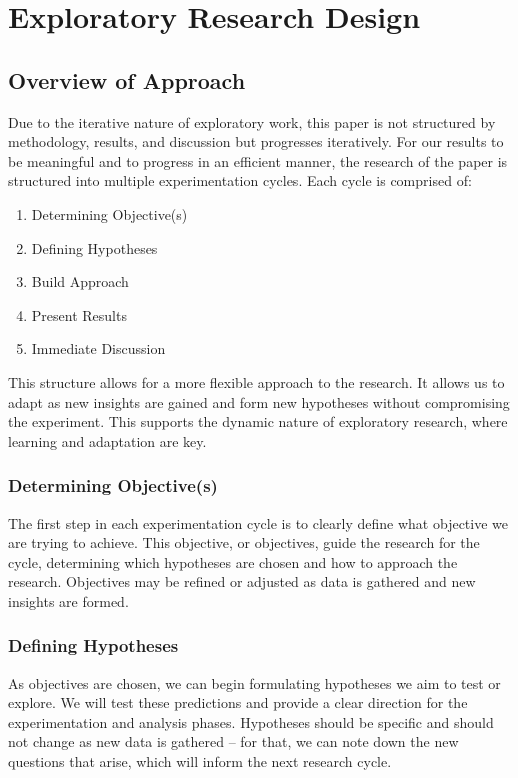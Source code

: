 \chapter{Exploratory Research Design}
\label{chap:exploratoryResearchDesign}

\section{Overview of Approach}
Due to the iterative nature of exploratory work, this paper is not structured by methodology, results, and discussion but progresses iteratively. For our results to be meaningful and to progress in an efficient manner, the research of the paper is structured into multiple experimentation cycles. Each cycle is comprised of:

\begin{enumerate}
    \item Determining Objective(s)
    \item Defining Hypotheses
    \item Build Approach
    \item Present Results
    \item Immediate Discussion
\end{enumerate}

This structure allows for a more flexible approach to the research. It allows us to adapt as new insights are gained and form new hypotheses without compromising the experiment. This supports the dynamic nature of exploratory research, where learning and adaptation are key.

\subsection*{Determining Objective(s)}
The first step in each experimentation cycle is to clearly define what objective we are trying to achieve. This objective, or objectives, guide the research for the cycle, determining which hypotheses are chosen and how to approach the research. Objectives may be refined or adjusted as data is gathered and new insights are formed.

\subsection*{Defining Hypotheses}
As objectives are chosen, we can begin formulating hypotheses we aim to test or explore. We will test these predictions and provide a clear direction for the experimentation and analysis phases. Hypotheses should be specific and should not change as new data is gathered -- for that, we can note down the new questions that arise, which will inform the next research cycle.

